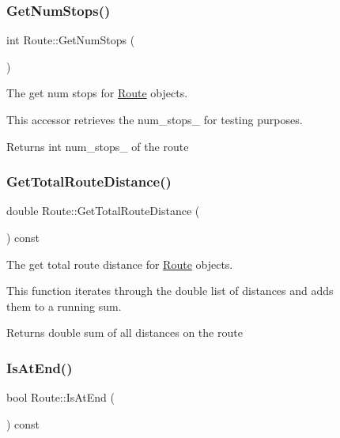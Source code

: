 \begin{figure}[H]
\begin{center}
\subsubsection{\texorpdfstring{Get\+Num\+Stops()}{GetNumStops()}}
{\footnotesize\ttfamily int Route\+::\+Get\+Num\+Stops (\begin{DoxyParamCaption}{ }\end{DoxyParamCaption})}



The get num stops for \hyperlink{classRoute}{Route} objects. 

This accessor retrieves the num\+\_\+stops\+\_\+ for testing purposes.

\begin{DoxyReturn}{Returns}
int num\+\_\+stops\+\_\+ of the route 
\end{DoxyReturn}
\mbox{\label{classRoute_af4e0add4a9f6b22963398b41313f9e69}} 
\subsubsection{\texorpdfstring{Get\+Total\+Route\+Distance()}{GetTotalRouteDistance()}}
{\footnotesize\ttfamily double Route\+::\+Get\+Total\+Route\+Distance (\begin{DoxyParamCaption}{ }\end{DoxyParamCaption}) const}



The get total route distance for \hyperlink{classRoute}{Route} objects. 

This function iterates through the double list of distances and adds them to a running sum.

\begin{DoxyReturn}{Returns}
double sum of all distances on the route 
\end{DoxyReturn}
\mbox{\label{classRoute_a529ab995aefd1001b250a6c1ccf77892}} 
\subsubsection{\texorpdfstring{Is\+At\+End()}{IsAtEnd()}}
{\footnotesize\ttfamily bool Route\+::\+Is\+At\+End (\begin{DoxyParamCaption}{ }\end{DoxyParamCaption}) const}




\end{center}
\end{figure}
